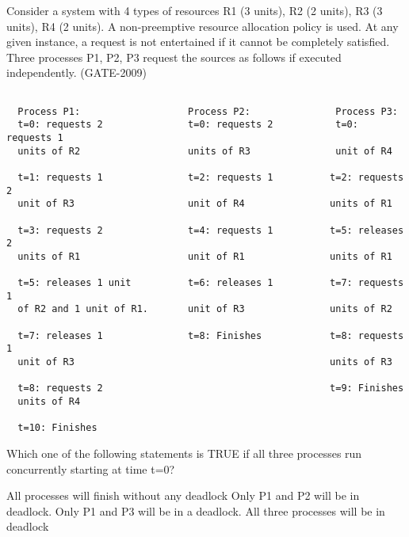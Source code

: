 
\begin{minipage}{\linewidth}

  \question  Consider a system with 4 types of resources R1 (3 units), R2 (2 units), R3 (3 units), R4 (2 units).
             A non-preemptive resource allocation policy is used. At any given instance, a request is not entertained
             if it cannot be completely satisfied. Three processes P1, P2, P3 request the sources as follows
             if executed independently. (GATE-2009)

\begin{lstlisting}

  Process P1:                   Process P2:               Process P3:
  t=0: requests 2               t=0: requests 2           t=0: requests 1
  units of R2                   units of R3               unit of R4

  t=1: requests 1               t=2: requests 1          t=2: requests 2
  unit of R3                    unit of R4               units of R1

  t=3: requests 2               t=4: requests 1          t=5: releases 2
  units of R1                   unit of R1               units of R1

  t=5: releases 1 unit          t=6: releases 1          t=7: requests 1
  of R2 and 1 unit of R1.       unit of R3               units of R2

  t=7: releases 1               t=8: Finishes            t=8: requests 1
  unit of R3                                             units of R3

  t=8: requests 2                                        t=9: Finishes
  units of R4

  t=10: Finishes

\end{lstlisting}

             Which one of the following statements is TRUE if all three processes run concurrently starting at time t=0?
  \begin{choices}
    \choice All processes will finish without any deadlock
    \choice Only P1 and P2 will be in deadlock.
    \choice Only P1 and P3 will be in a deadlock.
    \choice All three processes will be in deadlock
  \end{choices}

  \end{minipage}

